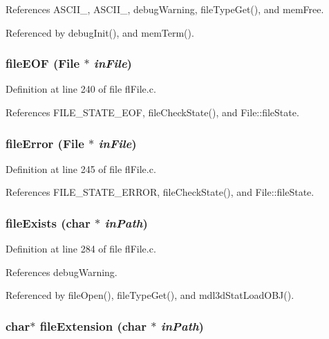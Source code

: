 References ASCII\_, ASCII\_, debug\-Warning, file\-Type\-Get(), and mem\-Free.

Referenced by debug\-Init(), and mem\-Term().
\subsubsection{ file\-EOF ({\bf File} $\ast$ {\em in\-File})}\label{flFile_8h_19a3ec1ad7d0cd9025f03e79413b2047}




Definition at line 240 of file fl\-File.c.

References FILE\_\-STATE\_\-EOF, file\-Check\-State(), and File::file\-State.
\subsubsection{ file\-Error ({\bf File} $\ast$ {\em in\-File})}\label{flFile_8h_fc8a85a9141393dcf10baa6a2872488a}




Definition at line 245 of file fl\-File.c.

References FILE\_\-STATE\_\-ERROR, file\-Check\-State(), and File::file\-State.
\subsubsection{ file\-Exists (char $\ast$ {\em in\-Path})}\label{flFile_8h_cb13135f9a1ef103656139296d2caf4d}




Definition at line 284 of file fl\-File.c.

References debug\-Warning.

Referenced by file\-Open(), file\-Type\-Get(), and mdl3d\-Stat\-Load\-OBJ().
\subsubsection{\setlength{\rightskip}{0pt plus 5cm}char$\ast$ file\-Extension (char $\ast$ {\em in\-Path})}\label{flFile_8h_af44cc7d91d32ad0474ad4bc359aeaf3}




